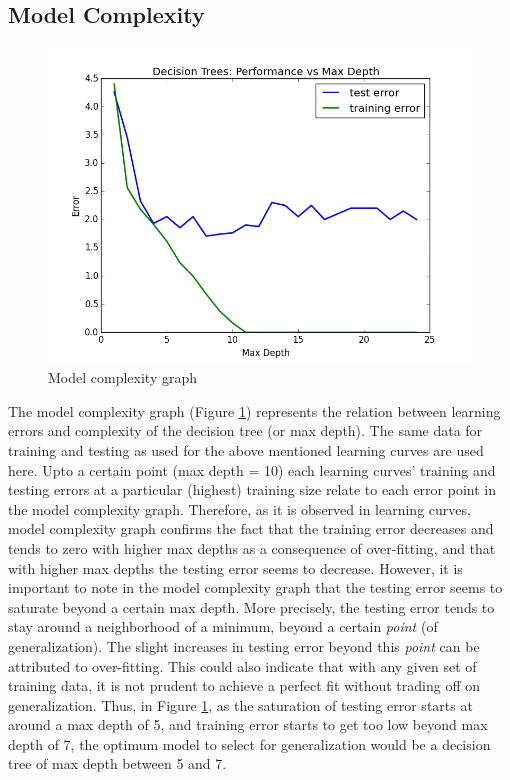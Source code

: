 \documentclass{article}
\begin{document}
	\subsection{Model Complexity}
	\begin{figure}[h]
		\centering
		\includegraphics[scale=0.4]{model_complexity_graph}
		\caption{Model complexity graph}
		\label{fig:modelComplexity}
	\end{figure}
	The model complexity graph (Figure \ref{fig:modelComplexity}) represents the relation between learning errors and complexity of the decision tree (or max depth). The same data for training and testing as used for the above mentioned learning curves are used here. Upto a certain point (max depth = 10) each learning curves' training and testing errors at a particular (highest) training size relate to each error point in the model complexity graph. Therefore, as it is observed in learning curves, model complexity graph confirms the fact that the training error decreases and tends to zero with higher max depths as a consequence of over-fitting, and that with higher max depths the testing error seems to decrease. However, it is important to note in the model complexity graph that the testing error seems to saturate beyond a certain max depth. More precisely, the testing error tends to stay around a neighborhood of a minimum, beyond a certain \emph{point} (of generalization). The slight increases in testing error beyond this \emph{point} can be attributed to over-fitting. This could also indicate that with any given set of training data, it is not prudent to achieve a perfect fit without trading off on generalization. Thus, in Figure \ref{fig:modelComplexity}, as the saturation of testing error starts at around a max depth of 5, and training error starts to get too low beyond max depth of 7, the optimum model to select for generalization would be a decision tree of max depth between 5 and 7.
\end{document}
